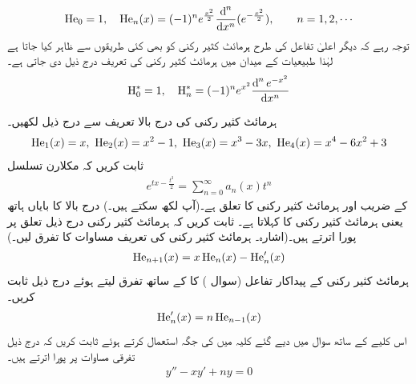 \begin{align}\label{مساوات_طاقتی_ہرمائٹ_کثیر_رکنی_تعریف}
\He_0=1,\quad \He_n(x)=(-1)^n e^{\frac{x^2}{2}}\frac{\dif^{\,n}}{\dif x^n}(e^{-\frac{x^2}{2}}),\quad\quad n=1,2,\cdots 
\end{align}
توجہ رہے کہ دیگر اعلیٰ تفاعل کی طرح ہرمائٹ کثیر رکنی کو بھی کئی طریقوں سے ظاہر کیا جاتا ہے لہٰذا طبیعیات کے میدان میں  ہرمائٹ کثیر رکنی  کی  تعریف درج ذیل دی جاتی ہے۔  
\begin{align*}
\mathrm{H}_0^*=1,\quad \mathrm{H}_n^*=(-1)^ne^{x^2}\frac{\dif ^{\, n} e^{-x^2}}{\dif x^n}
\end{align*}


ہرمائٹ کثیر رکنی کی درج بالا تعریف سے درج ذیل لکھیں۔
\begin{align*}
\operatorname{He}_1(x)=x,\,\, \operatorname{He}_2(x)=x^2-1,\,\, \operatorname{He}_3(x)=x^3-3x,\,\, \operatorname{He}_4(x)=x^4-6x^2+3
\end{align*}
ثابت کریں کہ  مکلارن تسلسل
\begin{align*}
e^{tx-\tfrac{t^2}{2}}=\sum_{n=0}^{\infty}a_n(x)t^n
\end{align*}
کے  ضریب  اور ہرمائٹ کثیر رکنی کا تعلق  ہے۔(آپ  لکھ سکتے ہیں۔) درج بالا کا بایاں ہاتھ یعنی  ہرمائٹ کثیر رکنی کا  کہلاتا ہے۔
ثابت کریں کہ ہرمائٹ کثیر رکنی درج ذیل تعلق پر پورا اترتے ہیں۔(اشارہ۔ ہرمائٹ کثیر رکنی کی تعریف مساوات  کا تفرق لیں۔)
\begin{align*}
\operatorname{He}_{n+1}(x)=x\operatorname{He}_n(x)-\operatorname{He}_n'(x)
\end{align*}
ہرمائٹ کثیر رکنی کے پیداکار تفاعل (سوال ) کا  کے ساتھ تفرق لیتے ہوئے درج ذیل ثابت کریں۔
\begin{align*}
\operatorname{He}_n'(x)=n\operatorname{He}_{n-1}(x)
\end{align*} 
اس کلیے کے ساتھ سوال  میں دیے گئے کلیہ میں  کی جگہ  استعمال کرتے ہوئے ثابت کریں کہ  درج ذیل تفرقی مساوات پر پورا اترتے ہیں۔
\begin{align*}
y''-xy'+ny=0
\end{align*} 
